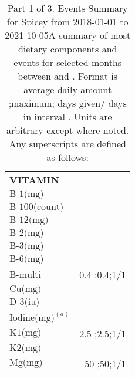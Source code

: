 \begin{table}[H]
\begin{tabular}{|l|r|}
{\bf VITAMIN}&\\
$\textrm{B-1(mg)}$&\\
$\textrm{B-100(count)}$&\\
$\textrm{B-12(mg)}$&\\
$\textrm{B-2(mg)}$&\\
$\textrm{B-3(mg)}$&\\
$\textrm{B-6(mg)}$&\\
$\textrm{B-multi}$&0.4 ;0.4;1/1\\
$\textrm{Cu(mg)}$&\\
$\textrm{D-3(iu)}$&\\
$\textrm{Iodine(mg)}^{\left(a\right)}$&\\
$\textrm{K1(mg)}$&2.5 ;2.5;1/1\\
$\textrm{K2(mg)}$&\\
$\textrm{Mg(mg)}$&50 ;50;1/1\\
\hline
\end{tabular}
\caption{Part 1 of 3.  Events Summary for Spicey   from 2018-01-01 to 2021-10-05A summary of most dietary components and events  for selected months between \mjmdatemin and \mjmdatemax. Format is average daily amount ;maximum; days given/ days in interval . Units are arbitrary except where noted. Any  superscripts are defined as follows:  \mjmsuperscripts}
\end{table}

